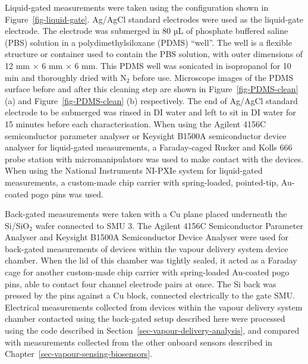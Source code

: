 \documentclass[
  a4paper,
]{scrbook}
\begin{document}
Liquid-gated measurements were taken using the configuration shown in
Figure~\ref{fig-liquid-gate}. Ag/AgCl standard electrodes were used as
the liquid-gate electrode. The electrode was submerged in 80 µL of
phosphate buffered saline (PBS) solution in a polydimethylsiloxane
(PDMS) ``well''. The well is a flexible structure or container used to
contain the PBS solution, with outer dimensions of 12 mm \(\times\) 6 mm
\(\times\) 6 mm. This PDMS well was sonicated in isopropanol for 10 min
and thoroughly dried with N\(_2\) before use. Microscope images of the
PDMS surface before and after this cleaning step are shown in
Figure~\ref{fig-PDMS-clean} (a) and Figure~\ref{fig-PDMS-clean} (b)
respectively. The end of Ag/AgCl standard electrode to be submerged was
rinsed in DI water and left to sit in DI water for 15 minutes before
each characterisation. When using the Agilent 4156C semiconductor
parameter analyser or Keysight B1500A semiconductor device analyser for
liquid-gated measurements, a Faraday-caged Rucker and Kolls 666 probe
station with micromanipulators was used to make contact with the
devices. When using the National Instruments NI-PXIe system for
liquid-gated measurements, a custom-made chip carrier with
spring-loaded, pointed-tip, Au-coated pogo pins was used.

Back-gated measurements were taken with a Cu plane placed underneath the
Si/SiO\(_2\) wafer connected to SMU 3. The Agilent 4156C Semiconductor
Parameter Analyser and Keysight B1500A Semiconductor Device Analyser
were used for back-gated measurements of devices within the vapour
delivery system device chamber. When the lid of this chamber was tightly
sealed, it acted as a Faraday cage for another custom-made chip carrier
with spring-loaded Au-coated pogo pins, able to contact four channel
electrode pairs at once. The Si back was pressed by the pins against a
Cu block, connected electrically to the gate SMU. Electrical
measurements collected from devices within the vapour delivery system
chamber contacted using the back-gated setup described here were
processed using the code described in
Section~\ref{sec-vapour-delivery-analysis}, and compared with
measurements collected from the other onboard sensors described in
Chapter~\ref{sec-vapour-sensing-biosensors}.
\end{document}
